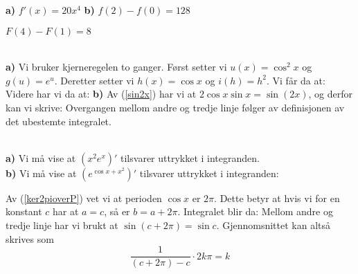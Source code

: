 





 \textbf{a)} $ f'(x)=20x^4 $ \textbf{b)}  $ f(2)-f(0)=128 $ \vsk

 $ F(4)-F(1)=8 $ \vsk

\\
\textbf{a)} Vi bruker kjerneregelen to ganger. Først setter vi $ u(x) = \cos^2 x $ og $ g(u)=e^{u} $. Deretter setter vi $ h(x)=\cos x $ og $ i(h)=h^2 $. Vi får da at:
Videre har vi da at:
\textbf{b)} Av (\ref{sin2x}) har vi at $ 2\cos x \sin x = \sin(2x) $, og derfor kan vi skrive:
Overgangen mellom andre og tredje linje følger av definisjonen av det ubestemte integralet. \vsk

\\
\textbf{a)} Vi må vise at $ \left(x^2 e^x \right)'$ tilsvarer uttrykket i integranden.
\\
\textbf{b)} Vi må vise at $ \left(e^{\cos x+x^2}\right)' $ tilsvarer uttrykket i integranden:

Av (\ref{ker2pioverP}) vet vi at perioden $ \cos x $ er $ 2\pi $. Dette betyr at hvis vi for en konstant $ c $ har at $ a=c $, så er $ b=a+2\pi $. Integralet blir da:
Mellom andre og tredje linje har vi brukt at $ \sin(c+2\pi)=\sin c $. Gjennomsnittet kan altså skrives som
\[ \frac{1}{(c+2\pi)-c}\cdot 2k\pi = k \]

